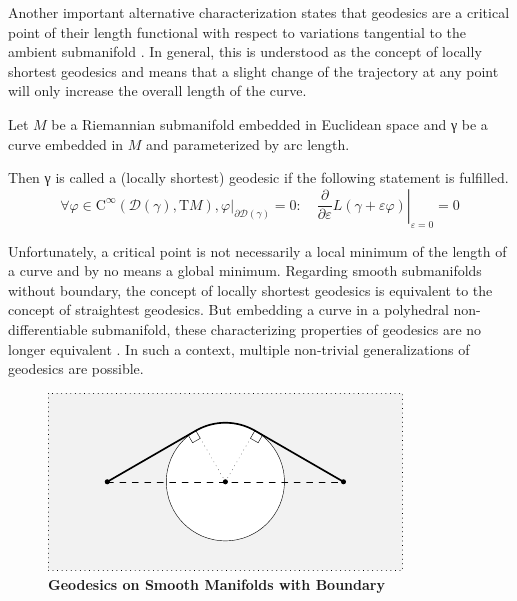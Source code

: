 \documentclass{stdlocal}
\begin{document}
  Another important alternative characterization states that geodesics are a critical point of their length functional with respect to variations tangential to the ambient submanifold \autocite{polthier2006}.
  In general, this is understood as the concept of locally shortest geodesics and means that a slight change of the trajectory at any point will only increase the overall length of the curve.

  \begin{definition}
    Let $M$ be a Riemannian submanifold embedded in Euclidean space and γ be a curve embedded in $M$ and parameterized by arc length.

    Then γ is called a (locally shortest) geodesic if the following statement is fulfilled.
    \[
      \forall φ\in\mathrm{C}^\infty(\mathscr{D}(γ),\mathrm{T}M), φ\vert_{\partial\mathscr{D}(γ)} = 0 \colon\quad
      \left.\frac{\partial}{\partial ε}L(γ + εφ)\right|_{ε=0} = 0
    \]
  \end{definition}
  Unfortunately, a critical point is not necessarily a local minimum of the length of a curve and by no means a global minimum.
  Regarding smooth submanifolds without boundary, the concept of locally shortest geodesics is equivalent to the concept of straightest geodesics.
  But embedding a curve in a polyhedral non-differentiable submanifold, these characterizing properties of geodesics are no longer equivalent \autocite{polthier2006}.
  In such a context, multiple non-trivial generalizations of geodesics are possible.

  \begin{figure}[t]
    \centering
    \includegraphics[width=0.8\linewidth]{figures/geodesic-on-boundary-smooth.pdf}
    \caption[Geodesics on Smooth Manifolds with Boundary]{%
      \textbf{Geodesics on Smooth Manifolds with Boundary}\\
    }
    \label{fig:geodesic-on-manifold-with-boundary-smooth}
  \end{figure}
\end{document}
